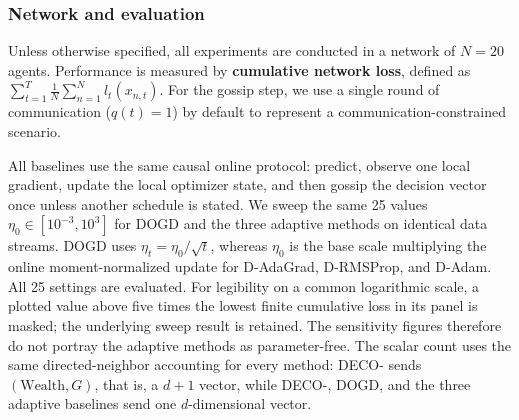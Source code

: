 \documentclass[journal]{IEEEtran}
\newcommand{\w}{\text{Wealth}}
\newcommand{\algname}{{DECO}\xspace}
\begin{document}
\subsubsection*{Network and evaluation}
Unless otherwise specified, all experiments are conducted in a network of $N=20$ agents.
Performance is measured by \textbf{cumulative network loss}, defined as $\sum_{t=1}^{T} \frac{1}{N} \sum_{n=1}^{N} l_{t}(x_{n,t})$.
For the gossip step, we use a single round of communication ($q(t)=1$) by default to represent a communication-constrained scenario.
    {\color{blue}
        All baselines use the same causal online protocol: predict, observe one local gradient, update the local optimizer state, and then gossip the decision vector once unless another schedule is stated.
        We sweep the same 25 values $\eta_0\in[10^{-3},10^3]$ for DOGD and the three adaptive methods on identical data streams.
        DOGD uses $\eta_t=\eta_0/\sqrt{t}$, whereas $\eta_0$ is the base scale multiplying the online moment-normalized update for D-AdaGrad, D-RMSProp, and D-Adam.
        All 25 settings are evaluated. For legibility on a common logarithmic scale, a plotted value above five times the lowest finite cumulative loss in its panel is masked; the underlying sweep result is retained.
        The sensitivity figures therefore do not portray the adaptive methods as parameter-free.
        The scalar count uses the same directed-neighbor accounting for every method: \algname{}- sends $(\w,G)$, that is, a $d+1$ vector, while \algname{}-, DOGD, and the three adaptive baselines send one $d$-dimensional vector.
        \par}
\end{document}
